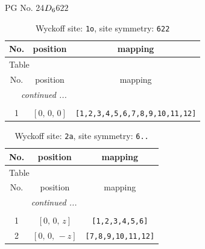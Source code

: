 \documentclass[fleqn,8pt]{jsarticle}
\begin{document}
\setcounter{MaxMatrixCols}{32}

\renewcommand{\tablename}{Table~}
\renewcommand{\figurename}{Figure~}
\begin{center}
\LARGE
PG No. 24\quad$D_{\rm 6}$\quad$622$\quad[ hexagonal ]
\end{center}
\renewcommand{\arraystretch}{1.2}
\begin{longtable}{ccc}
\caption{Wyckoff site: {\tt 1o}, site symmetry: {\tt 622}}
 \\
 \hline \hline
No. & position & mapping \\ \hline \endfirsthead

\multicolumn{2}{l}{\tablename\ \thetable{}} \\
 \hline \hline
No. & position & mapping \\ \hline \endhead

 \hline \hline
\multicolumn{2}{r}{\footnotesize\it continued ...} \\ \endfoot

 \hline \hline
\multicolumn{2}{r}{} \\ \endlastfoot

1 & $\left[ 0,\, 0,\, 0 \right]$ & {\tt [1,2,3,4,5,6,7,8,9,10,11,12]} \\
\end{longtable}
\renewcommand{\arraystretch}{1.2}
\begin{longtable}{ccc}
\caption{Wyckoff site: {\tt 2a}, site symmetry: {\tt 6..}}
 \\
 \hline \hline
No. & position & mapping \\ \hline \endfirsthead

\multicolumn{2}{l}{\tablename\ \thetable{}} \\
 \hline \hline
No. & position & mapping \\ \hline \endhead

 \hline \hline
\multicolumn{2}{r}{\footnotesize\it continued ...} \\ \endfoot

 \hline \hline
\multicolumn{2}{r}{} \\ \endlastfoot

1 & $\left[ 0,\, 0,\, z \right]$ & {\tt [1,2,3,4,5,6]} \\ \hline
2 & $\left[ 0,\, 0,\, - z \right]$ & {\tt [7,8,9,10,11,12]} \\
\end{longtable}
\renewcommand{\arraystretch}{1.2}
\end{document}
